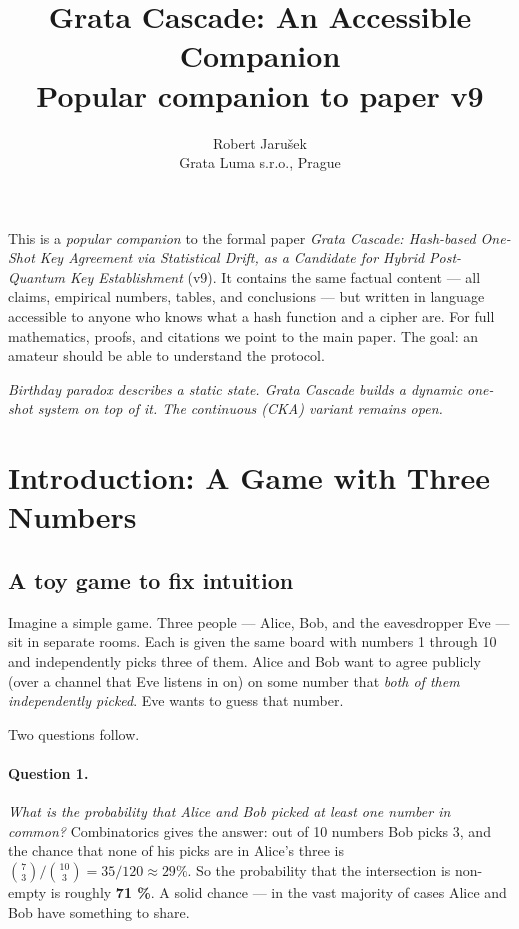 \documentclass[11pt,a4paper]{article}
\title{Grata Cascade: An Accessible Companion\\
\large Popular companion to paper v9}
\author{Robert Jarušek\\Grata Luma s.r.o., Prague}
\date{}
\begin{document}
\maketitle

\begin{tldr}
This is a \emph{popular companion} to the formal paper \emph{Grata Cascade: Hash-based One-Shot Key Agreement via Statistical Drift, as a Candidate for Hybrid Post-Quantum Key Establishment} (v9). It contains the same factual content --- all claims, empirical numbers, tables, and conclusions --- but written in language accessible to anyone who knows what a hash function and a cipher are. For full mathematics, proofs, and citations we point to the main paper. The goal: an amateur should be able to understand the protocol.
\end{tldr}

\medskip
\noindent\emph{Birthday paradox describes a static state. Grata Cascade builds a dynamic one-shot system on top of it. The continuous (CKA) variant remains open.}

\tableofcontents
\bigskip

\section{Introduction: A Game with Three Numbers}\label{pop:intro}

\subsection{A toy game to fix intuition}

Imagine a simple game. Three people --- Alice, Bob, and the eavesdropper Eve --- sit in separate rooms. Each is given the same board with numbers 1 through 10 and independently picks three of them. Alice and Bob want to agree publicly (over a channel that Eve listens in on) on some number that \emph{both of them independently picked}. Eve wants to guess that number.

Two questions follow.

\paragraph{Question 1.} \emph{What is the probability that Alice and Bob picked at least one number in common?} Combinatorics gives the answer: out of 10 numbers Bob picks 3, and the chance that none of his picks are in Alice's three is $\binom{7}{3}/\binom{10}{3} = 35/120 \approx 29\%$. So the probability that the intersection is non-empty is roughly \textbf{71 \%}. A solid chance --- in the vast majority of cases Alice and Bob have something to share.
\end{document}
